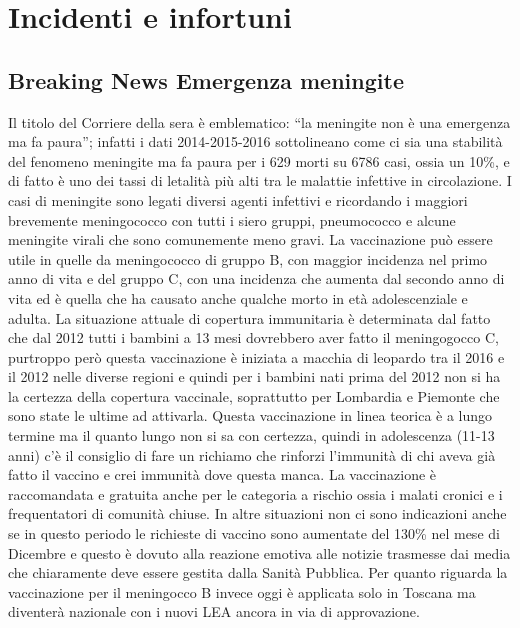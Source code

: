 \section{Incidenti e infortuni}

\subsection{Breaking News Emergenza meningite}

Il titolo del Corriere della sera è emblematico: ``la meningite non è
una emergenza ma fa paura''; infatti i dati 2014-2015-2016 sottolineano
come ci sia una stabilità del fenomeno meningite ma fa paura per i 629
morti su 6786 casi, ossia un 10\%, e di fatto è uno dei tassi di
letalità più alti tra le malattie infettive in circolazione. I casi di
meningite sono legati diversi agenti infettivi e ricordando i maggiori
brevemente meningococco con tutti i siero gruppi, pneumococco e alcune
meningite virali che sono comunemente meno gravi. La vaccinazione può
essere utile in quelle da meningococco di gruppo B, con maggior
incidenza nel primo anno di vita e del gruppo C, con una incidenza che
aumenta dal secondo anno di vita ed è quella che ha causato anche
qualche morto in età adolescenziale e adulta. La situazione attuale di
copertura immunitaria è determinata dal fatto che dal 2012 tutti i
bambini a 13 mesi dovrebbero aver fatto il meningogocco C, purtroppo
però questa vaccinazione è iniziata a macchia di leopardo tra il 2016 e
il 2012 nelle diverse regioni e quindi per i bambini nati prima del 2012
non si ha la certezza della copertura vaccinale, soprattutto per
Lombardia e Piemonte che sono state le ultime ad attivarla. Questa
vaccinazione in linea teorica è a lungo termine ma il quanto lungo non
si sa con certezza, quindi in adolescenza (11-13 anni) c'è il consiglio
di fare un richiamo che rinforzi l'immunità di chi aveva già fatto il
vaccino e crei immunità dove questa manca. La vaccinazione è
raccomandata e gratuita anche per le categoria a rischio ossia i malati
cronici e i frequentatori di comunità chiuse. In altre situazioni non ci
sono indicazioni anche se in questo periodo le richieste di vaccino sono
aumentate del 130\% nel mese di Dicembre e questo è dovuto alla reazione
emotiva alle notizie trasmesse dai media che chiaramente deve essere
gestita dalla Sanità Pubblica. Per quanto riguarda la vaccinazione per
il meningocco B invece oggi è applicata solo in Toscana ma diventerà
nazionale con i nuovi LEA ancora in via di approvazione.

